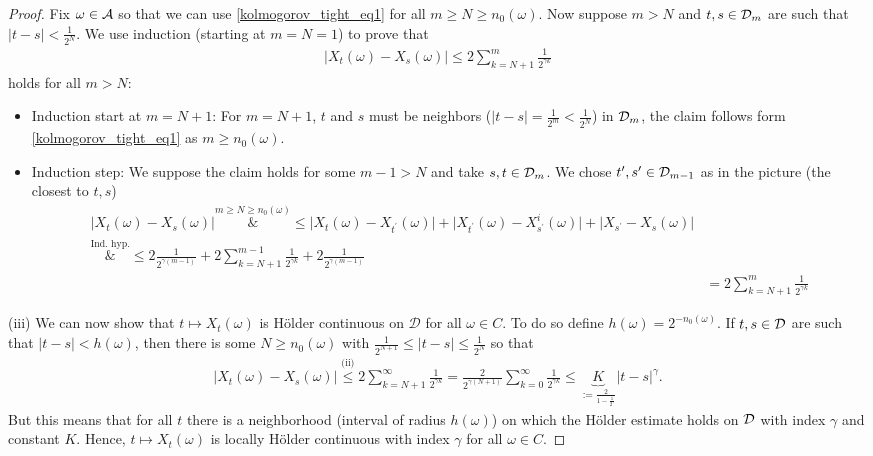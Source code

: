 \begin{proof}[Proof]
		Fix $\omega \in \mathcal{A}$ so that we can use \eqref{kolmogorov_tight_eq1} for all $m\geq N \geq n_0(\omega)$. Now suppose $m > N$ and $t,s\in \mathcal{D}_m$ are such that $|t- s| < \frac{1}{2^N}$. We use induction (starting at $m=N=1$) to prove that
		\begin{align*}
			| X_t(\omega) - X_s(\omega) | \leq 2  \sum_{k=N+1}^m \frac{1}{2^{\gamma k}}
		\end{align*}
		holds for all $m>N$:
		\begin{itemize}
				\item Induction start at $m=N+1$: For $m=N+1$, $t$ and $s$ must be neighbors ($\lvert t- s \rvert = \frac{1}{2^m}< \frac{1}{2^N}$) in $\mathcal{D}_m$, the claim follows form \eqref{kolmogorov_tight_eq1} as $m\geq n_0(\omega)$.
				\item Induction step: We suppose the claim holds for some $m-1>N$ and take $s,t\in \mathcal{D}_m$. We chose $t^{\prime},s^{\prime}\in\mathcal{D}_{m-1}$ as in the picture (the closest to $t,s$)
					\begin{align*}
						\lvert X_t(\omega) - X_s(\omega)\rvert
						\overset{m \geq N \geq n_0(\omega)}&{\leq} \lvert X_t(\omega) - X_{t^{\prime}}(\omega) \rvert + \lvert X_{t^{\prime}}(\omega) - X_{s^{\prime}}^i(\omega) \rvert + \lvert X_{s^{\prime}} - X_s(\omega) \rvert \\
						\overset{\text{Ind. hyp.}}&{\leq} 2  \frac{1}{2^{\gamma(m-1)}} + 2  \sum_{k=N+1}^{m-1} \frac{1}{2^{\gamma  k}} + 2  \frac{1}{2^{\gamma(m-1)}} \\
						&= 2  \sum_{k=N+1}^{m} \frac{1}{2^{\gamma  k}}
					\end{align*}
			\end{itemize}
		(iii) We can now show that $t\mapsto X_t(\omega)$ is H\"older continuous on $\mathcal D$ for all $\omega \in C$. To do so define $h(\omega) = 2^{-n_0(\omega)}$. If $t,s\in\mathcal{D}$ are such that $\lvert t-s \rvert < h(\omega)$, then there is some $N \geq n_0(\omega)$ with $\frac{1}{2^{N+1}} \leq \lvert t - s \rvert \leq \frac{1}{2^N}$ so that 
			\begin{align}\label{cau}
				\lvert X_t(\omega) - X_s(\omega) \rvert \overset{\text{(ii)}}{\leq} 2  \sum_{k=N+1}^{\infty} \frac{1}{2^{\gamma  k}} = \frac{2}{2^{\gamma(N+1)}} \sum_{k=0}^{\infty} \frac{1}{2^{\gamma  k}} \leq \underbrace{K}_{:=\frac{2}{1-\frac{1}{2^{\gamma}}}}  \lvert t-s \rvert^{\gamma}.
			\end{align}
			But this means that for all $t$ there is a neighborhood (interval of radius $h(\omega)$) on which the H\"older estimate holds on $\mathcal{D}$ with index $\gamma$ and constant $K$. Hence, $t\mapsto X_t(\omega)$ is locally H\"older continuous with index $\gamma$ for all $\omega \in C$.\smallskip


\end{proof}
